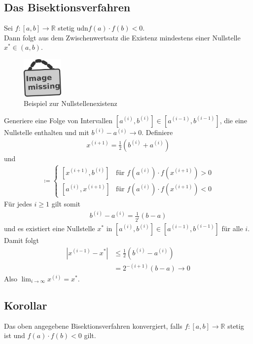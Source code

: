 \documentclass[ngerman,fontsize=11pt, paper=a4, parskip=half, titlepage=true, toc=bib]{scrbook}
\newcommand{\R}{\mathds{R}}
\newcommand{\imagemissing}[1]{
	\begin{figure}
		\parbox{\linewidth}{
			\centering
			\includegraphics[width=2cm]{images/image_missing.jpg}
		}
		\caption{#1}
	\end{figure}
}
\begin{document}
	  \subsection{Das Bisektionsverfahren}
	  Sei $f:[a,b]\rightarrow \R $ stetig udn$f(a) \cdot f(b) <0$.\\
	  Dann folgt aus dem Zwischenwertsatz die Existenz
	  mindestens einer Nullstelle $x^{*}\in (a,b)$.
	  
	  \imagemissing{Beispiel zur Nullstellenexistenz}
	  
	  Generiere eine Folge von Intervallen
	  $[a^{(i)}, b^{(i)}]\in  [a^{(i-1)}, b^{(i-1)}] $,
	  die eine Nullstelle enthalten und mit $b^{(i)}-a^{(i)} \longrightarrow 0$.
	  Definiere
	  \begin{gather}
	  	x^{(i+1)}= \frac{1}{2}(b^{(i)}+a^{(i)})
	  	\label{V.1.1}
	  \end{gather}
	  und
	  \begin{gather}
	  	[a^{(i+1)}, b^{(i+1)}] \coloneqq \begin{cases}
	  		 [x^{(i+1)}, b^{(i)}] & \text{für } f(a^{(i)})\cdot f(x^{(i+1)}) > 0 \\
	  		 [a^{(i)}, x^{(i+1)}] & \text{für } f(a^{(i)})\cdot f(x^{(i+1)}) < 0
	  	\end{cases}
	  	\label{V.1.2}
	  \end{gather}
	  Für jedes $i\geq 1$ gilt somit
	  \begin{gather*}
	  	b^{(i)}-a^{(i)} = \frac{1}{2^i}(b-a)
	  \end{gather*}
	  und es existiert eine Nullstelle $x^{*}$ in $[a^{(i)}, b^{(i)}]\in  [a^{(i-1)}, b^{(i-1)}] $
	  für alle $i$. \\
	  Damit folgt
	  \begin{align*}
	  	|x^{(i-1)}-x^{*}| &\leq \frac{1}{2}(b^{(i)}-a^{(i)}) \\
	  								&=  2^{-(i+1)} (b-a) \longrightarrow 0
	  \end{align*}
	  Also $\lim_{i\rightarrow \infty}x^{(i)} = x^{*}$.
	  
	  
	\subsection{Korollar}
	Das oben angegebene Bisektionsverfahren konvergiert, falls
	$f:[a,b]\rightarrow \R $ stetig ist und 
	$f(a)\cdot f(b) <0$ gilt.
	
\end{document}
